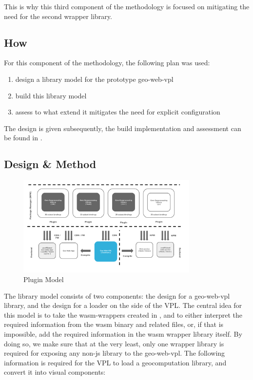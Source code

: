 This is why this third component of the methodology is focused on mitigating the need for the second wrapper library. 

\subsection*{How}
For this component of the methodology, the following plan was used: 
\begin{enumerate}[-]
  \item design a library model for the prototype \ac*{geo-web-vpl}
  \item build this library model 
  \item assess to what extend it mitigates the need for explicit configuration
\end{enumerate}

The design is given subsequently, the build implementation and assessment can be found in .

\subsection{Design \& Method}

\begin{figure}
  \centering
  \graphicspath{ {../../assets/diagrams/} }
  \includegraphics[width=340px]{Model Proposal.png}
  \caption{Plugin Model}
  \label{fig:plugin-model}
\end{figure}

The library model consists of two components: the design for a geo-web-vpl library, and the design for a 
loader on the side of the VPL. 
The central idea for this model is to take the wasm-wrappers created in , and to either interpret the required information from the wasm binary and related files, or, if that is impossible, add the required information in the wasm wrapper library itself.
By doing so, we make sure that at the very least, only one wrapper library is required for exposing any non-js library to the \ac{geo-web-vpl}.
The following information is required for the VPL to load a geocomputation library, and convert it into visual components:

